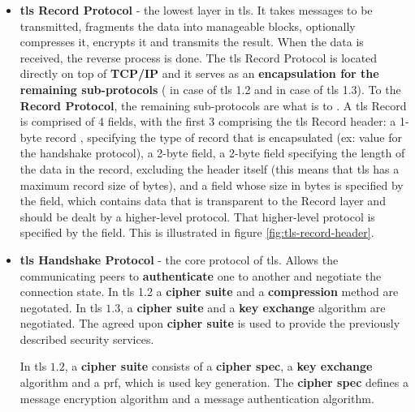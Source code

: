 \documentclass{llncs}
\begin{document}
\begin{itemize}
  \item \textbf{\gls{tls} Record Protocol} - the lowest layer in \gls{tls}.
  It takes messages to be transmitted, fragments the data into manageable
  blocks, optionally compresses it, encrypts it and transmits the result.
  When the data is received, the reverse process is done. The \gls{tls}
  Record Protocol is located directly on top of \textbf{TCP/IP} and it serves as an
   \textbf{encapsulation for the remaining sub-protocols} ( in case of \gls{tls} 1.2
   and  in case of \gls{tls} 1.3). To the  \textbf{Record Protocol},
   the remaining sub-protocols are what  is to .
   A \gls{tls} Record is comprised of 4 fields, with the first 3 comprising the
   \gls{tls} Record header: a 1-byte record ,
   specifying the type of record that is encapsulated (ex: value 
   for the handshake protocol), a 2-byte  field, a
   2-byte  field specifying the length of the data in the record, excluding
   the header itself (this means that \gls{tls} has a maximum record size
   of  bytes), and a  field whose size in bytes is specified
   by the  field, which contains data that is
   transparent to the Record layer and should be dealt by a higher-level protocol. That higher-level protocol is specified by the  field. This is illustrated in figure \ref{fig:tls-record-header}.
  \item \textbf{\gls{tls} Handshake Protocol} - the core protocol of \gls{tls}.
  Allows the communicating peers to \textbf{authenticate} one to another and negotiate the connection state. In \gls{tls} 1.2
  a \textbf{cipher suite} and a \textbf{compression} method are negotated. In \gls{tls} $1.3$, a \textbf{cipher suite} and a \textbf{key exchange} algorithm are negotiated. The agreed upon \textbf{cipher suite} is used to provide the previously described security services.

  In
  \gls{tls} $1.2$, a \textbf{cipher suite} consists of a \textbf{cipher spec},
  a \textbf{key exchange} algorithm and a \gls{prf}, which is used key generation. The
  \textbf{cipher spec} defines a message encryption algorithm and a message
  authentication algorithm.


\end{itemize}
\end{document}
